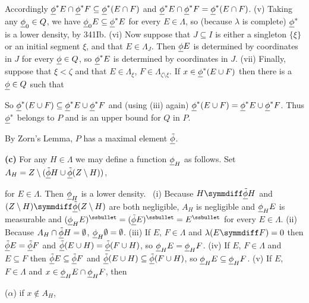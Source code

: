 {\noindent Accordingly
${\underline{\phi}}^*E\cap{\underline{\phi}}^*F\subseteq{\underline{\phi}}^*(E\cap F)$ and
${\underline{\phi}}^*E\cap{\underline{\phi}}^*F={\underline{\phi}}^*(E\cap F)$.   (v) Taking any
${\underline{\phi}}_0\in Q$, we have ${\underline{\phi}}_0E\subseteq{\underline{\phi}}^*E$ for every
$E\in\Lambda$, so (because $\lambda$ is complete) ${\underline{\phi}}^*$ is a
lower density, by 341Ib.   (vi) Now suppose that $J\subseteq I$ is
either a singleton $\{\xi\}$ or an initial segment $\xi$, and that
$E\in\Lambda_J$.   Then ${\underline{\phi}} E$ is determined by coordinates in $J$
for every ${\underline{\phi}}\in Q$, so ${\underline{\phi}}^*E$ is determined by coordinates
in $J$.   (vii) Finally, suppose that $\xi<\zeta$ and that
$E\in\Lambda_{\xi}$, $F\in\Lambda_{\zeta\setminus\xi}$.   If
$x\in{\underline{\phi}}^*(E\cup F)$ then there is a ${\underline{\phi}}\in Q$ such that


\noindent So ${\underline{\phi}}^*(E\cup F)\subseteq{\underline{\phi}}^*E\cup{\underline{\phi}}^*F$ and
(using (iii) again) ${\underline{\phi}}^*(E\cup F)={\underline{\phi}}^*E\cup{\underline{\phi}}^*F$.
Thus
${\underline{\phi}}^*$ belongs to $P$ and is an upper bound for $Q$ in $P$.\ \Qed

By Zorn's Lemma, $P$ has a maximal element $\underline{\tilde\phi}$.

\medskip


{\bf (c)} For any $H\in\Lambda$ we may define a function ${\underline{\phi}}_H$ as
follows.   Set $A_H=Z\setminus(\underline{\tilde\phi} H\cup\underline{\tilde\phi}(Z\setminus H))$,


\noindent for $E\in\Lambda$.   Then ${\underline{\phi}}_H$ is a lower density.
\Prf\ (i) Because $H\symmdiff\tmputp H$ and $(Z\setminus
H)\symmdiff\tmputp(Z\setminus H)$ are both negligible, $A_H$ is
negligible and ${\underline{\phi}}_HE$ is measurable and
$(\undphi_H E)^{\ssbullet}=(\tmputp E)^{\ssbullet}=E^{\ssbullet}$ for
every $E\in\Lambda$.
(ii) Because $A_H\cap\underline{\tilde\phi} H=\emptyset$,
${\underline{\phi}}_H\emptyset=\emptyset$.
(iii) If $E$, $F\in\Lambda$ and $\lambda(E\symmdiff F)=0$ then
$\underline{\tilde\phi} E=\underline{\tilde\phi} F$ and $\underline{\tilde\phi}(E\cup H)=\underline{\tilde\phi}(F\cup H)$, so
${\underline{\phi}}_H E={\underline{\phi}}_H F$.
(iv) If $E$, $F\in\Lambda$ and $E\subseteq F$ then $\underline{\tilde\phi}
E\subseteq\underline{\tilde\phi} F$ and $\underline{\tilde\phi}(E\cup H)\subseteq\underline{\tilde\phi}(F\cup H)$, so
${\underline{\phi}}_H E\subseteq{\underline{\phi}}_H F$.
(v) If $E$, $F\in\Lambda$ and $x\in{\underline{\phi}}_H E\cap{\underline{\phi}}_H F$, then

\qquad($\alpha$) if $x\notin A_H$,


}
